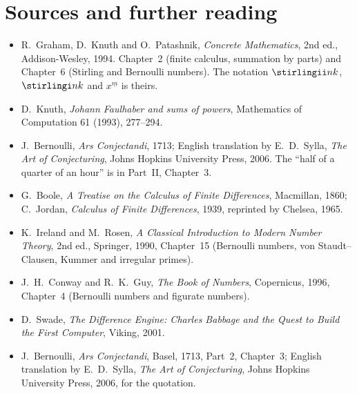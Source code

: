 \section*{Sources and further reading}

\begin{itemize}
\item R.~Graham, D.~Knuth and O.~Patashnik, \emph{Concrete Mathematics}, 2nd ed., Addison-Wesley, 1994. Chapter~2
(finite calculus, summation by parts) and Chapter~6 (Stirling and Bernoulli numbers). The notation
$\stirlingii nk$, $\stirlingi nk$ and $x^{\underline m}$ is theirs.
\item D.~Knuth, \emph{Johann Faulhaber and sums of powers}, Mathematics of Computation 61 (1993), 277--294.
\item J.~Bernoulli, \emph{Ars Conjectandi}, 1713; English translation by E.~D.~Sylla, \emph{The Art of Conjecturing},
Johns Hopkins University Press, 2006. The ``half of a quarter of an hour'' is in Part~II, Chapter~3.
\item G.~Boole, \emph{A Treatise on the Calculus of Finite Differences}, Macmillan, 1860; C.~Jordan, \emph{Calculus of
Finite Differences}, 1939, reprinted by Chelsea, 1965.
\item K.~Ireland and M.~Rosen, \emph{A Classical Introduction to Modern Number Theory}, 2nd ed., Springer, 1990,
Chapter~15 (Bernoulli numbers, von Staudt--Clausen, Kummer and irregular primes).
\item J.~H.~Conway and R.~K.~Guy, \emph{The Book of Numbers}, Copernicus, 1996, Chapter~4 (Bernoulli numbers and
figurate numbers).
\item D.~Swade, \emph{The Difference Engine: Charles Babbage and the Quest to Build the First Computer}, Viking, 2001.
\item J.~Bernoulli, \emph{Ars Conjectandi}, Basel, 1713, Part~2, Chapter~3; English translation by E.~D.~Sylla, \emph{The Art of Conjecturing}, Johns Hopkins University Press, 2006, for the quotation.
\end{itemize}
